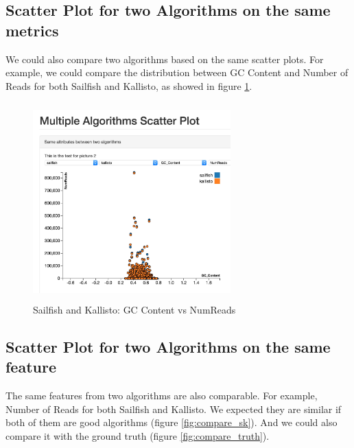 \documentclass[11pt,letter]{article}
\begin{document}
\subsection {Scatter Plot for two Algorithms on the same metrics}
We could also compare two algorithms based on the same scatter plots. For example, we could compare the distribution between GC Content and Number of Reads for both Sailfish and Kallisto, as showed in figure \ref{fig:two_algo}.

\begin{figure}[h!]
\centering
\includegraphics[height=3in, width=3in]{./fig/two_algo.jpg}
\caption{Sailfish and Kallisto:  GC Content vs  NumReads}
\label{fig:two_algo}
\end{figure}

\subsection {Scatter Plot for two Algorithms on the same feature}
The same features from two algorithms are also comparable. For example, Number of Reads for both Sailfish and Kallisto. We expected they are similar if both of them are good algorithms (figure \ref{fig:compare_sk}). And we could also compare it with the ground truth (figure \ref{fig:compare_truth}).
\end{document}
